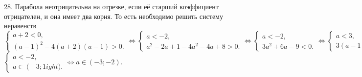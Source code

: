 28. Парабола неотрицательна на отрезке, если её старший коэффициент отрицателен, и она имеет два корня. То есть необходимо решить систему неравенств $\begin{cases} a+2<0,\\ (a-1)^2-4(a+2)(a-1)>0.\end{cases}\Leftrightarrow\begin{cases} a<-2,\\ a^2-2a+1-4a^2-4a+8>0.\end{cases}\Leftrightarrow
\begin{cases} a<-2,\\ 3a^2+6a-9<0.\end{cases}\Leftrightarrow\begin{cases} a<3,\\ 3(a-1)(a+3)<0.\end{cases}\Leftrightarrow$\\$
\begin{cases} a<-2,\\ a\in\left(-3;1
ight).\end{cases}\Leftrightarrow a\in(-3;-2).$\\

